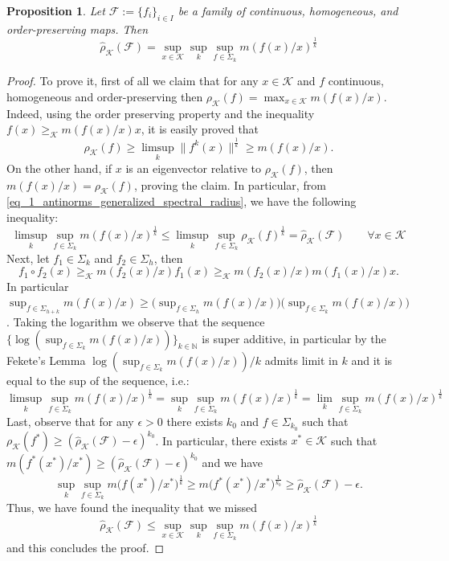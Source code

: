 \documentclass{article}
\newtheorem{proposition}[theorem]{Proposition}
\newcommand{\family}{\mathcal{F}}
\newcommand{\cradius}{\rho_{\cone}}
\newcommand{\cgradius}{\widehat{\rho}_{\cone}}
\newcommand{\cone}{\mathcal{K}}
\newcommand{\cgeq}{\geq_{\cone}}
\begin{document}
\begin{proposition}
    Let $\family:=\{f_i\}_{i\in I}$ be a family of continuous, homogeneous, and order-preserving maps. Then 
$$\cgradius(\family)=\sup_{x\in \cone} \sup_{k}\sup_{f\in \Sigma_k} m(f(x)/x)^{\frac{1}{k}}$$ 
\end{proposition}
%
\begin{proof}
To prove it, first of all we {claim} that for any $x\in \cone$ and $f$ continuous, homogeneous and order-preserving then $\cradius(f)=\max_{x\in\cone} m(f(x)/x)$. Indeed, using the order preserving property and the inequality $f(x)\cgeq m(f(x)/x)x $, it is easily proved that 
%
\begin{equation}\label{eq_1_antinorms_generalized_spectral_radius}
\cradius(f)\geq \limsup_k \|f^k(x)\|^{\frac{1}{k}}\geq m(f(x)/x).
\end{equation}
%
On the other hand, if $x$ is an eigenvector relative to $\cradius(f)$, then $m(f(x)/x)=\cradius(f)$, proving the claim. 
%
%
%
In particular, from \eqref{eq_1_antinorms_generalized_spectral_radius}, we have the following inequality:
\begin{equation}
    \limsup_{k}\sup_{f\in \Sigma_k} m(f(x)/x)^{\frac{1}{k}}\leq \limsup_{k}\sup_{f\in \Sigma_k} \cradius(f)^{\frac{1}{k}}=\cgradius(\family) \qquad \forall x\in\cone
\end{equation}
%
Next, let $f_1\in \Sigma_k$ and $f_2\in \Sigma_h$, then 
\begin{equation}
    f_1\circ f_2(x)\cgeq m(f_2(x)/x) f_1(x)\cgeq m(f_2(x)/x) m(f_1(x)/x) x.
\end{equation}
In particular $\sup_{f\in \Sigma_{h+k}}m(f(x)/x)\geq \big(\sup_{f\in \Sigma_{h}}m(f(x)/x)\big) \big(\sup_{f\in \Sigma_{k}}m(f(x)/x)\big)$. Taking the logarithm we observe that the sequence $\{\log(\sup_{f\in \Sigma_{k}}m(f(x)/x))\}_{k\in \mathbb{N}}$ is super additive, in particular by the Fekete's Lemma $\log(\sup_{f\in \Sigma_{k}}m(f(x)/x))/k$ admits limit in $k$ and it is equal to the sup of the sequence, i.e.: 
\begin{equation}
    \limsup_{k}\sup_{f\in \Sigma_k} m(f(x)/x)^{\frac{1}{k}}=
    \sup_{k}\sup_{f\in \Sigma_k} m(f(x)/x)^{\frac{1}{k}}=
    \lim_{k}\sup_{f\in \Sigma_k} m(f(x)/x)^{\frac{1}{k}}
\end{equation}
%
Last, observe that for any $\epsilon>0$ there exists $k_0$ and $f\in \Sigma_{k_0}$ such that $\cradius(f^*)\geq (\cgradius(\family)-\epsilon)^{k_0}$. In particular, there exists $x^*\in \cone$ such that $m(f^*(x^*)/x^*)\geq (\cgradius(\family)-\epsilon)^{k_0}$ and we have 
%
\begin{equation}
\sup_k\sup_{f\in\Sigma_k}m\big(f(x^*)/x^*\big)^\frac{1}{k}\geq m\big(f^*(x^*)/x^*\big)^{\frac{1}{k_0}}\geq \cgradius(\family)-\epsilon.    
\end{equation}
%
Thus, we have found the inequality that we missed
\begin{equation}
\cgradius(\family)\leq\sup_{x\in \cone} \sup_{k}\sup_{f\in \Sigma_k} m(f(x)/x)^{\frac{1}{k}}
\end{equation}
and this concludes the proof.
\end{proof}
\end{document}
